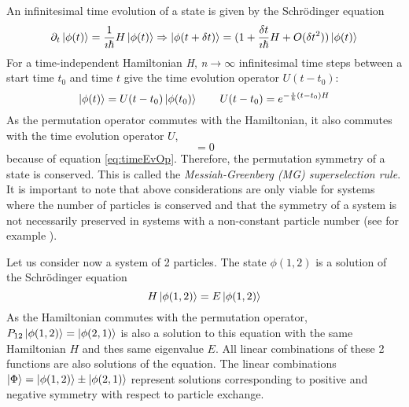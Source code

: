 An infinitesimal time evolution of a state is given by the Schrödinger equation
\begin{equation}
 \partial_{t}\ket{\phi(t)} = \frac{1}{\imath\hbar} H \ket{\phi(t)} \Rightarrow \ket{\phi(t+\delta t)} = (1 + \frac{\delta t}{ \imath\hbar} H + O(\delta t^{2}))\ket{\phi(t)}
\end{equation} 
For a time-independent Hamiltonian \textit{H}, \textit{n}$\rightarrow \infty$ infinitesimal time steps between a start time $t_{0}$ and time $t$ give the time evolution operator $U(t-t_{0})$:
\begin{equation}
\label{eq:timeEvOp}
 \ket{\phi(t)} = U(t-t_{0})\ket{\phi(t_{0})} \hspace{2em} U(t-t_{0}) = e^{-\frac{\imath}{\hbar}(t-t_{0})H}
\end{equation} 
As the permutation operator commutes with the Hamiltonian, it also commutes with the time evolution operator $U$,
\begin{equation}
 [P,U] = 0
\end{equation} 
because of equation \ref{eq:timeEvOp}. Therefore, the permutation symmetry of a state is conserved. This is called the \textit{Messiah-Greenberg (MG) superselection rule}. It is important to note that above considerations are only viable for systems where the number of particles is conserved and that the symmetry of a system is not necessarily preserved in systems with a non-constant particle number (see for example \cite{Messiah1964}). 

Let us consider now a system of 2 particles. The state $\phi(1,2)$ is a solution of the Schrödinger equation
\begin{equation}
 H \ket{\phi(1,2)} = E \ket{\phi(1,2)}
\end{equation} 
As the Hamiltonian commutes with the permutation operator, $P_{12} \ket{\phi(1,2)} = \ket{\phi(2,1)}$ is also a solution to this equation with the same Hamiltonian $H$ and thes same eigenvalue $E$. All linear combinations of these 2 functions are also solutions of the equation. The linear combinations $\ket{\Phi} = \ket{\phi(1,2)} \pm \ket{\phi(2,1)}$ represent solutions corresponding to positive and negative symmetry with respect to particle exchange. 

